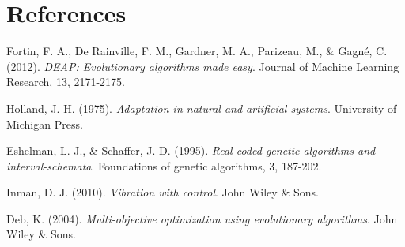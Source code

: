 \documentclass[12pt,a4paper]{article}
\begin{document}
\section{References}

\begin{thebibliography}{9}

Fortin, F. A., De Rainville, F. M., Gardner, M. A., Parizeau, M., \& Gagné, C. (2012).
\textit{DEAP: Evolutionary algorithms made easy}.
Journal of Machine Learning Research, 13, 2171-2175.

Holland, J. H. (1975).
\textit{Adaptation in natural and artificial systems}.
University of Michigan Press.

Eshelman, L. J., \& Schaffer, J. D. (1995).
\textit{Real-coded genetic algorithms and interval-schemata}.
Foundations of genetic algorithms, 3, 187-202.

Inman, D. J. (2010).
\textit{Vibration with control}.
John Wiley \& Sons.

Deb, K. (2004).
\textit{Multi-objective optimization using evolutionary algorithms}.
John Wiley \& Sons.

\end{thebibliography}
\end{document}
